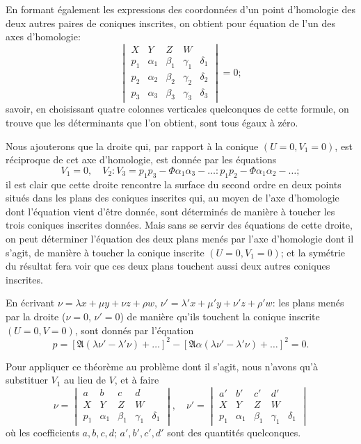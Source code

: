 \documentclass[11pt,a4paper]{book}
\begin{document}
En formant \'{e}galement les expressions des coordonn\'{e}es d'un point d'homologie des deux autres paires de coniques inscrites, on obtient pour \'{e}quation de l'un des axes d'homologie:
\[
\begin{vmatrix}
X & Y & Z & W \\
p_1 & \alpha_1 & \beta_1 & \gamma_1 & \delta_1 \\
p_2 & \alpha_2 & \beta_2 & \gamma_2 & \delta_2 \\
p_3 & \alpha_3 & \beta_3 & \gamma_3 & \delta_3
\end{vmatrix} = 0;
\]
savoir, en choisissant quatre colonnes verticales quelconques de cette formule, on trouve que les d\'{e}terminants que l'on obtient, sont tous \'{e}gaux \`{a} z\'{e}ro.

Nous ajouterons que la droite qui, par rapport \`{a} la conique $(U = 0, V_1 = 0)$, est r\'{e}ciproque de cet axe d'homologie, est donn\'{e}e par les \'{e}quations
\[
V_1 = 0, \quad V_2 : V_3 = p_1 p_3 - \Phi \alpha_1 \alpha_3 - \ldots : p_1 p_2 - \Phi \alpha_1 \alpha_2 - \ldots;
\]
il est clair que cette droite rencontre la surface du second ordre en deux points situ\'{e}s dans les plans des coniques inscrites qui, au moyen de l'axe d'homologie dont l'\'{e}quation vient d'\^{e}tre donn\'{e}e, sont d\'{e}termin\'{e}s de mani\`{e}re \`{a} toucher les trois coniques inscrites donn\'{e}es. Mais sans se servir des \'{e}quations de cette droite, on peut d\'{e}terminer l'\'{e}quation des deux plans men\'{e}s par l'axe d'homologie dont il s'agit, de mani\`{e}re \`{a} toucher la conique inscrite $(U = 0, V_1 = 0)$; et la sym\'{e}trie du r\'{e}sultat fera voir que ces deux plans touchent aussi deux autres coniques inscrites.

En \'{e}crivant $\nu = \lambda x + \mu y + \nu z + \rho w$, $\nu' = \lambda' x + \mu' y + \nu' z + \rho' w$: les plans men\'{e}s par la droite ($\nu = 0$, $\nu' = 0$) de mani\`{e}re qu'ils touchent la conique inscrite $(U = 0, V = 0)$, sont donn\'{e}s par l'\'{e}quation
\[
p = [\mathfrak{A}(\lambda \nu' - \lambda' \nu) + \ldots]^2 - [\mathfrak{A}\alpha(\lambda \nu' - \lambda' \nu) + \ldots]^2 = 0.
\]

Pour appliquer ce th\'{e}or\`{e}me au probl\`{e}me dont il s'agit, nous n'avons qu'\`{a} substituer $V_1$ au lieu de $V$, et \`{a} faire
\[
\nu =
\begin{vmatrix}
a & b & c & d \\
X & Y & Z & W \\
p_1 & \alpha_1 & \beta_1 & \gamma_1 & \delta_1
\end{vmatrix},
\quad
\nu' =
\begin{vmatrix}
a' & b' & c' & d' \\
X & Y & Z & W \\
p_1 & \alpha_1 & \beta_1 & \gamma_1 & \delta_1
\end{vmatrix}
\]
o\`{u} les coefficients $a, b, c, d$; $a', b', c', d'$ sont des quantit\'{e}s quelconques.
\end{document}
